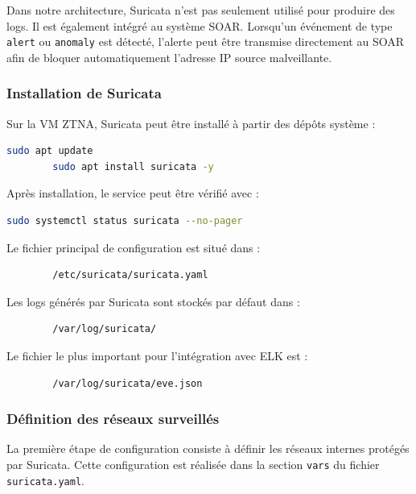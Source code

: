 \documentclass[12pt,a4paper,oneside]{report}
\begin{document}
	Dans notre architecture, Suricata n'est pas seulement utilisé pour produire des logs. Il est également intégré au système SOAR. Lorsqu'un événement de type \texttt{alert} ou \texttt{anomaly} est détecté, l'alerte peut être transmise directement au SOAR afin de bloquer automatiquement l'adresse IP source malveillante.
	
	\subsubsection{Installation de Suricata}
	
	Sur la VM ZTNA, Suricata peut être installé à partir des dépôts système :
	
	\begin{lstlisting}[language=bash]
		sudo apt update
		sudo apt install suricata -y
	\end{lstlisting}
	
	Après installation, le service peut être vérifié avec :
	
	\begin{lstlisting}[language=bash]
		sudo systemctl status suricata --no-pager
	\end{lstlisting}
	
	Le fichier principal de configuration est situé dans :
	
	\begin{lstlisting}
		/etc/suricata/suricata.yaml
	\end{lstlisting}
	
	Les logs générés par Suricata sont stockés par défaut dans :
	
	\begin{lstlisting}
		/var/log/suricata/
	\end{lstlisting}
	
	Le fichier le plus important pour l'intégration avec ELK est :
	
	\begin{lstlisting}
		/var/log/suricata/eve.json
	\end{lstlisting}
	
	\subsubsection{Définition des réseaux surveillés}
	
	La première étape de configuration consiste à définir les réseaux internes protégés par Suricata. Cette configuration est réalisée dans la section \texttt{vars} du fichier \texttt{suricata.yaml}.
	
\end{document}
